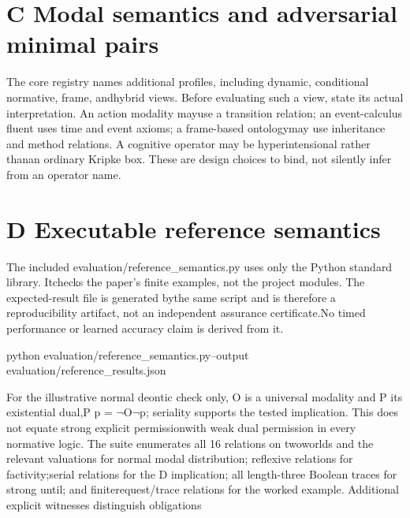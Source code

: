 \section*{C  Modal semantics and adversarial minimal pairs}

\noindent
The core registry names additional profiles, including dynamic, conditional normative, frame, and\linebreak[4]
hybrid views. Before evaluating such a view, state its actual interpretation. An action modality may\linebreak[4]
use a transition relation; an event-calculus fluent uses time and event axioms; a frame-based ontology\linebreak[4]
may use inheritance and method relations. A cognitive operator may be hyperintensional rather than\linebreak[4]
an ordinary Kripke box. These are design choices to bind, not silently infer from an operator name.\par

\section*{D  Executable reference semantics}
\noindent
The included evaluation/reference\_semantics.py uses only the Python standard library. It\linebreak[4]
checks the paper's finite examples, not the project modules. The expected-result file is generated by\linebreak[4]
the same script and is therefore a reproducibility artifact, not an independent assurance certificate.\linebreak[4]
No timed performance or learned accuracy claim is derived from it.\par

\noindent
python evaluation/reference\_semantics.py\linebreak[4]
--output evaluation/reference\_results.json\par

\noindent
For the illustrative normal deontic check only, O is a universal modality and P its existential dual,\linebreak[4]
P p = \ensuremath{\neg}O\ensuremath{\neg}p; seriality supports the tested implication. This does not equate strong explicit permission\linebreak[4]
with weak dual permission in every normative logic. The suite enumerates all 16 relations on two\linebreak[4]
worlds and the relevant valuations for normal modal distribution; reflexive relations for factivity;\linebreak[4]
serial relations for the D implication; all length-three Boolean traces for strong until; and finite\linebreak[4]
request/trace relations for the worked example. Additional explicit witnesses distinguish obligations\par

